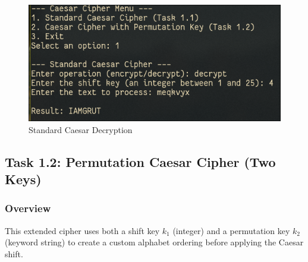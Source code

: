 \documentclass[a4paper,12pt]{article}
\begin{document}
\begin{enumerate}
\begin{figure}[htbp]
\centering
\includegraphics[width=.9\linewidth]{./results/caesar_dec.png}
\caption{\label{fig:org4093e58}Standard Caesar Decryption}
\end{figure}
\end{enumerate}
\subsection{Task 1.2: Permutation Caesar Cipher (Two Keys)}
\label{sec:orgdfb6dd2}
\subsubsection{Overview}
\label{sec:org2e85329}
This extended cipher uses both a shift key \(k_{1}\) (integer) and a permutation key \(k_{2}\) (keyword string) to create a custom alphabet ordering before applying the Caesar shift.
\end{document}
